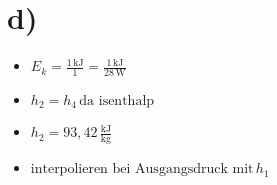 

\section*{d)}

\begin{itemize}
    \item \( E_k = \frac{1 \, \text{kJ}}{1} = \frac{1 \, \text{kJ}}{28 \, \text{W}} \)
    \item \( h_2 = h_4 \, \text{da isenthalp} \)
    \item \( h_2 = 93,42 \, \frac{\text{kJ}}{\text{kg}} \)
    \item \( \text{interpolieren bei Ausgangsdruck mit} \, h_1 \)
\end{itemize}